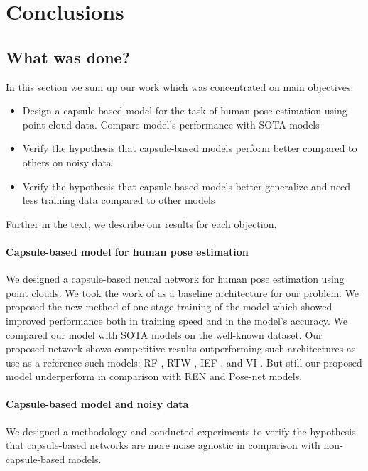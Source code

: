 \chapter{Conclusions}

\label{Conclusions}

\section{What was done?}
In this section we sum up our work which was concentrated on main objectives:
\begin{itemize}
  \item Design a capsule-based model for the task of human pose estimation using point cloud data. Compare model's performance with SOTA models
  \item Verify the hypothesis that capsule-based models perform better compared to others on noisy data
  \item Verify the hypothesis that capsule-based models better generalize and need less training data compared to other models
\end{itemize}

Further in the text, we describe our results for each objection.

\subsubsection{Capsule-based model for human pose estimation}
We designed a capsule-based neural network for human pose estimation using point clouds. We took the work \cite{wu_3d_2020} of as a baseline architecture for our problem. We proposed the new method of one-stage training of the model which showed improved performance both in training speed and in the model's accuracy. We compared our model with SOTA models on the well-known dataset. Our proposed network shows competitive results outperforming such architectures as use as a reference such models: RF \parencite{shotton_real-time_2011}, RTW \parencite{ho_yub_jung_random_2015}, IEF \parencite{carreira_human_2016}, and VI \parencite{haque_towards_2016}. But still our proposed model underperform in comparison with  REN \parencite{chen_pose_2020} and Pose-net \parencite{moon_v2v-posenet_2018} models.

\subsubsection{Capsule-based model and noisy data}
We designed a methodology and conducted experiments to verify the hypothesis that capsule-based networks are more noise agnostic in comparison with non-capsule-based models.

